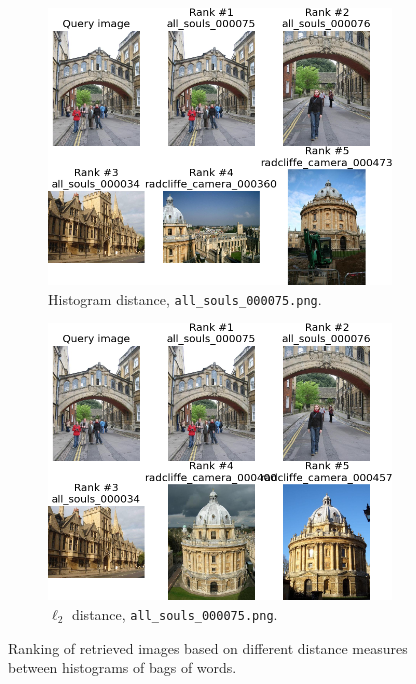 \documentclass[a4paper,10pt,twoside]{article}
\begin{document}
\begin{figure}
\begin{subfigure}{0.47\textwidth}
    \includegraphics[width=\textwidth]{ranking_h_75}
    \caption{Histogram distance, \texttt{all\_souls\_000075.png}.}
  \end{subfigure}
  \hspace*{\fill}
  \begin{subfigure}{0.47\textwidth}
    \centering
    \includegraphics[width=\textwidth]{ranking_l_75}
    \caption{$\ell_2$ distance, \texttt{all\_souls\_000075.png}.}
  \end{subfigure}
  \caption{Ranking of retrieved images based on different distance measures between histograms of bags of words.}
  \label{fig:bow_retrieval}
\end{figure}
\end{document}
